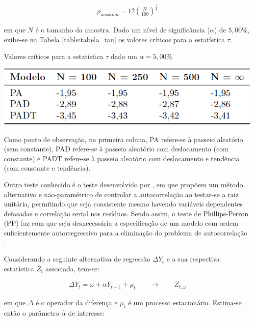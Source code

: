 \begin{ceqn}
\begin{align} \label{eq:rho_max}
\rho_{maxima} = 12 \left(\frac{N}{100}\right)^\frac{1}{4}
\end{align}
\end{ceqn} em que $N$ é o tamanho da amostra. Dado um nível de significância ($\alpha$) de $5,00$\%, exibe-se na Tabela \ref{table:tabela_tau} os valores críticos para a estatística $\tau$.

\begin{table}[hbtp]
	\centering
	\caption{Valores críticos para a estatística $\tau$ dado um $\alpha = 5,00$\%} \label{table:tabela_tau}
	\includegraphics[scale = 0.75]{figuras/tabela_tau.PNG}
\end{table}

Como ponto de observação, na primeira coluna, PA refere-se à passeio aleatório (sem constante), PAD refere-se à passeio aleatório com deslocamento (com constante) e PADT refere-se à passeio aleatório com deslocamento e tendência (com constante e tendência).


Outro teste conhecido é o teste desenvolvido por , em que propõem um método alternativo e não-paramétrico de controlar a autocorrelação ao testar-se a raiz unitária, permitindo que seja consistente mesmo havendo variáveis dependentes defasadas e correlação serial nos resíduos. Sendo assim, o teste de Phillips-Perron (PP) faz com que seja desnecessária a especificação de um modelo com ordem suficientemente autorregressivo para a eliminação do problema de autocorrelação \cite{bueno2008}.

Considerando a seguinte alternativa de regressão $\Delta Y_{t}$ e a sua respectiva estatística $Z_{t}$ associada, tem-se:

\begin{ceqn}
\begin{align} \label{eq:pp_1}
\Delta Y_{t} = \omega + \alpha Y_{t-1} + \mu_{t} \qquad \rightarrow \qquad Z_{t, \omega} 
\end{align}
\end{ceqn} em que $\Delta$ é o operador da diferença e $\mu_{t}$ é um processo estacionário. Estima-se então o parâmetro $\hat{\alpha}$ de interesse:

